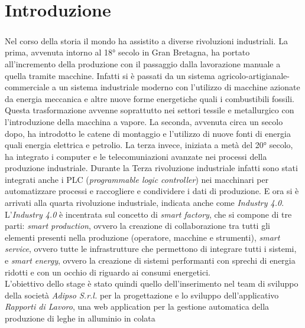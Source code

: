 \chapter*{Introduzione}
    \label{introduzione}
    \paragraph{}
    Nel corso della storia il mondo ha assistito a diverse rivoluzioni industriali. La prima,
    avvenuta intorno al 18° secolo in Gran Bretagna, ha portato all'incremento della produzione
    con il passaggio dalla lavorazione manuale a quella tramite macchine. Infatti si è passati da un
    sistema agricolo-artigianale-commerciale a un sistema industriale moderno con l'utilizzo di macchine
    azionate da energia meccanica e altre nuove forme energetiche quali i combustibili fossili. 
    Questa trasformazione avvenne soprattutto nei settori tessile e metallurgico con l'introduzione
    della macchina a vapore.
    La seconda, avvenuta circa un secolo dopo, ha introdotto le catene di montaggio e l'utilizzo di nuove fonti di energia quali
    energia elettrica e petrolio.
    La terza invece, iniziata a metà del 20° secolo, ha integrato i computer e le telecomuniazioni avanzate
    nei processi della produzione industriale. Durante la Terza rivoluzione industriale infatti
    sono stati integrati anche i PLC (\textit{programmable logic controller}) nei macchinari per automatizzare
    processi e raccogliere e condividere i dati di produzione. E ora si è arrivati alla quarta rivoluzione
    industriale, indicata anche come \textit{Industry 4.0}.\\
    L'\textit{Industry 4.0} è incentrata sul concetto di \textit{smart factory}, che si compone di tre parti: \textit{smart 
    production}, ovvero la creazione di collaborazione tra tutti gli elementi presenti nella produzione
    (operatore, macchine e strumenti), \textit{smart service}, ovvero tutte le infrastrutture
    che permettono di integrare tutti i sistemi, e \textit{smart energy}, ovvero la creazione di sistemi performanti
    con sprechi di energia ridotti e con un occhio di riguardo ai consumi energetici.\\
    L'obiettivo dello stage è stato quindi quello dell'inserimento nel team di sviluppo della società
    \textit{Adipso S.r.l.} per la progettazione e lo sviluppo dell'applicativo \textit{Rapporti di Lavoro},
    una web application per la gestione automatica della produzione di leghe in alluminio in colata

